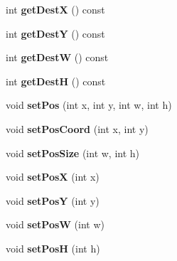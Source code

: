 \begin{DoxyCompactItemize}
\item 
int {\bfseries get\+DestX} () const \hypertarget{classObject_a676f44b728a130def5d481207b5207e0}{}\label{classObject_a676f44b728a130def5d481207b5207e0}

\item 
int {\bfseries get\+DestY} () const \hypertarget{classObject_a8360464ae4ca310dfade7e6177c0a62c}{}\label{classObject_a8360464ae4ca310dfade7e6177c0a62c}

\item 
int {\bfseries get\+DestW} () const \hypertarget{classObject_aba27e7c500253460648e8cf346f6d1ac}{}\label{classObject_aba27e7c500253460648e8cf346f6d1ac}

\item 
int {\bfseries get\+DestH} () const \hypertarget{classObject_a3c47c2d19a0173d0db7d5b855908a0c7}{}\label{classObject_a3c47c2d19a0173d0db7d5b855908a0c7}

\item 
void {\bfseries set\+Pos} (int x, int y, int w, int h)\hypertarget{classObject_a41afdccb37a804853d9d8704ed4a3b9b}{}\label{classObject_a41afdccb37a804853d9d8704ed4a3b9b}

\item 
void {\bfseries set\+Pos\+Coord} (int x, int y)\hypertarget{classObject_a494e9ca36ba11fa9f09de7f96711cee7}{}\label{classObject_a494e9ca36ba11fa9f09de7f96711cee7}

\item 
void {\bfseries set\+Pos\+Size} (int w, int h)\hypertarget{classObject_af35cb0478e83025206b9b87780ff9ba7}{}\label{classObject_af35cb0478e83025206b9b87780ff9ba7}

\item 
void {\bfseries set\+PosX} (int x)\hypertarget{classObject_ac419339f2d1173f39f355b7d8ccd1715}{}\label{classObject_ac419339f2d1173f39f355b7d8ccd1715}

\item 
void {\bfseries set\+PosY} (int y)\hypertarget{classObject_ac696206993d120e2e45fe1ce4bf16a53}{}\label{classObject_ac696206993d120e2e45fe1ce4bf16a53}

\item 
void {\bfseries set\+PosW} (int w)\hypertarget{classObject_a7adf0c2c59323a5b6de8f78262ea81d6}{}\label{classObject_a7adf0c2c59323a5b6de8f78262ea81d6}

\item 
void {\bfseries set\+PosH} (int h)\hypertarget{classObject_a86870ca9b06bd3153bb3f8e7b8835c46}{}\label{classObject_a86870ca9b06bd3153bb3f8e7b8835c46}


\end{DoxyCompactItemize}
